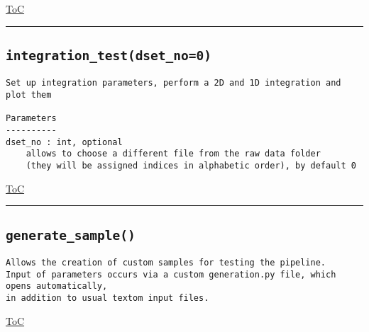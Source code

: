 \documentclass{article}
\begin{document}
\begin{flushright}

\hyperref[toc]{ToC}

\end{flushright}



\vspace{5mm}

\hrule

\subsection*{\texttt{integration\_test(dset\_no=0)}}
\label{fun:integrationtest}

\begin{lstlisting}[language=docstring]
Set up integration parameters, perform a 2D and 1D integration and plot them

Parameters
----------
dset_no : int, optional
    allows to choose a different file from the raw data folder
    (they will be assigned indices in alphabetic order), by default 0
\end{lstlisting}

\begin{flushright}

\hyperref[toc]{ToC}

\end{flushright}



\vspace{5mm}

\hrule

\subsection*{\texttt{generate\_sample()}}
\label{fun:generatesample}

\begin{lstlisting}[language=docstring]
Allows the creation of custom samples for testing the pipeline.
Input of parameters occurs via a custom generation.py file, which opens automatically,
in addition to usual textom input files.
\end{lstlisting}

\begin{flushright}

\hyperref[toc]{ToC}

\end{flushright}
\end{document}
